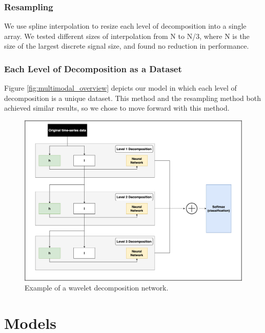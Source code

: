 \documentclass{turabian-thesis}
\begin{document}
\subsection{Resampling}

We use spline interpolation to resize each level of decomposition into a single array. We tested different sizes of interpolation from N to N/3, where N is the size of the largest discrete signal size, and found no reduction in performance.

\subsection{Each Level of Decomposition as a Dataset}
Figure \ref{fig:multimodal_overview} depicts our model in which each level of decomposition is a unique dataset. This method and the resampling method both achieved similar results, so we chose to move forward with this method.



\begin{figure}[h!]
   \begin{center}
      \includegraphics[scale=0.35]{../media/wavelet_decomp.png}
   \end{center}
   \caption{Example of a wavelet decomposition network.}
   \label{fig:wavelet_decomp}
\end{figure}


\chapter{Models}
\label{chap:models}
\end{document}
